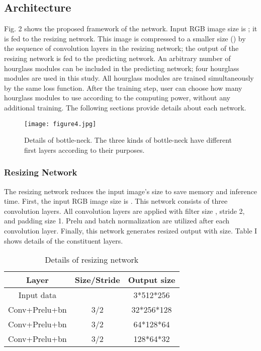 \documentclass[journal]{IEEEtran}
\begin{document}
\subsection{Architecture}
Fig. 2 shows the proposed framework of the network. Input RGB image size is ; it is fed to the resizing network. This image is compressed to a smaller size () by the sequence of convolution layers in the resizing network; the output of the resizing network is fed to the predicting network. An arbitrary number of hourglass modules can be included in the predicting network; four hourglass modules are used in this study. All hourglass modules are trained simultaneously by the same loss function. After the training step, user can choose how many hourglass modules to use according to the computing power, without any additional training. The following sections provide details about each network.

\begin{figure}
    \centering
    \texttt{[image: figure4.jpg]}
    \caption{Details of bottle-neck. The three kinds of bottle-neck have different first layers according to their purposes.}
\end{figure}

\subsubsection{Resizing Network}
The resizing network reduces the input image's size to save memory and inference time. First, the input RGB image size is . This network consists of three convolution layers. All convolution layers are applied with filter size , stride 2, and padding size 1. Prelu \cite{he2015delving} and batch normalization \cite{batchnorm} are utilized after each convolution layer. Finally, this network generates resized output with  size. Table I shows details of the constituent layers. 

\begin{table}[ht]
    \caption{Details of resizing network}
    \begin{center}
        \begin{tabular}{|c|c|c|}
            \hline
            \textbf{Layer} & \textbf{Size/Stride} & \textbf{Output size}\\
            \hline
            \hline
            Input data &  & 3*512*256\\
            Conv+Prelu+bn & 3/2 & 32*256*128\\
            Conv+Prelu+bn & 3/2 & 64*128*64\\
            Conv+Prelu+bn & 3/2 & 128*64*32\\
            \hline
        \end{tabular}
    \end{center}
\end{table}
\end{document}
